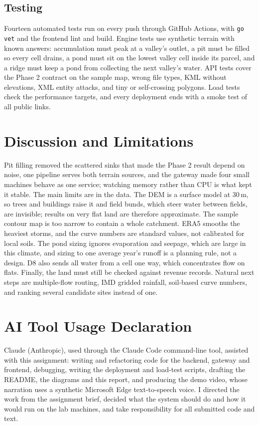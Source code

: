 \documentclass[manuscript,screen,review]{acmart}
\begin{document}
\subsection{Testing}
\label{sec:testing}
Fourteen automated tests run on every push through GitHub Actions, with \texttt{go vet} and the
frontend lint and build. Engine tests use synthetic terrain with known answers: accumulation must
peak at a valley's outlet, a pit must be filled so every cell drains, a pond must sit on the lowest
valley cell inside its parcel, and a ridge must keep a pond from collecting the next valley's water.
API tests cover the Phase 2 contract on the sample map, wrong file types, KML without elevations,
XML entity attacks, and tiny or self-crossing polygons. Load tests check the performance targets,
and every deployment ends with a smoke test of all public links.

\section{Discussion and Limitations}
\label{sec:discussion}
Pit filling removed the scattered sinks that made the Phase 2 result depend on noise, one pipeline
serves both terrain sources, and the gateway made four small machines behave as one service;
watching memory rather than CPU is what kept it stable. The main limits are in the data. The DEM is a surface model at 30\,m, so trees and
buildings raise it and field bunds, which steer water between fields, are invisible; results on
very flat land are therefore approximate. The sample contour map is too narrow to contain a whole
catchment. ERA5 smooths the heaviest storms, and the curve numbers are standard values, not
calibrated for local soils. The pond sizing ignores evaporation and seepage, which are large in
this climate, and sizing to one average year's runoff is a planning rule, not a design. D8 also
sends all water from a cell one way, which concentrates flow on flats. Finally, the land must still
be checked against revenue records. Natural next steps are multiple-flow routing, IMD gridded
rainfall, soil-based curve numbers, and ranking several candidate sites instead of one.

\section{AI Tool Usage Declaration}
\label{sec:ai-usage}
Claude (Anthropic), used through the Claude Code command-line tool, assisted with this assignment:
writing and refactoring code for the backend, gateway and frontend, debugging, writing the
deployment and load-test scripts, drafting the README, the diagrams and this report, and producing
the demo video, whose narration uses a synthetic Microsoft Edge text-to-speech voice. I directed
the work from the assignment brief, decided what the system should do and how it would run on the
lab machines, and take responsibility for all submitted code and text.
\end{document}
